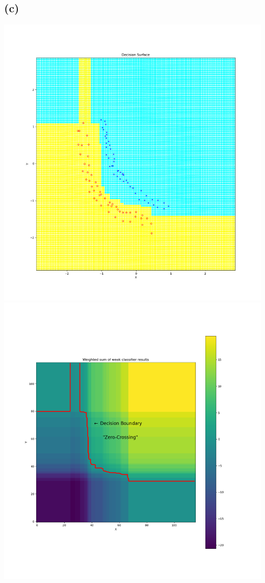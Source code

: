 \subsection*{(c)}
\includegraphics[width=.5\textwidth]{q3_adaboost_python/Figure_ADA_SIMPLE_1.png}
\includegraphics[width=.5\textwidth]{q3_adaboost_python/Figure_ADA_SIMPLE_2.png}

